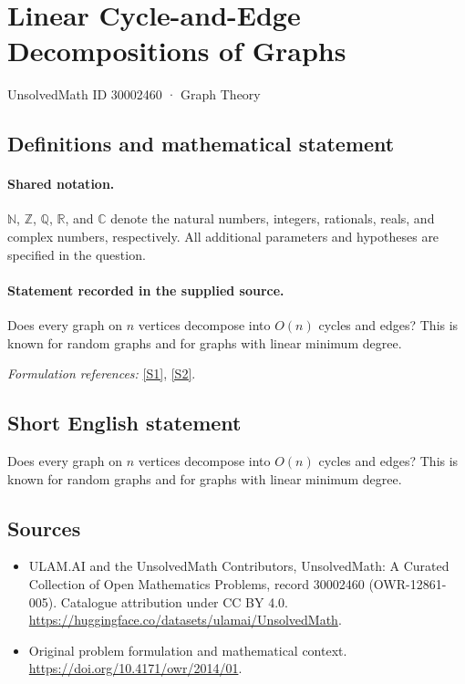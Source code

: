 \documentclass[11pt]{article}
\newcommand{\sref}[2]{\hyperlink{source:#1:#2}{[S#2]}}
\begin{document}
\setcounter{section}{30002459}
\section{Linear Cycle-and-Edge Decompositions of Graphs}\label{30002460}
{\small UnsolvedMath ID 30002460 · Graph Theory}
\subsection{Definitions and mathematical statement}

\paragraph{Shared notation.}$\mathbb N$, $\mathbb Z$, $\mathbb Q$, $\mathbb R$, and $\mathbb C$ denote the natural numbers, integers, rationals, reals, and complex numbers, respectively. All additional parameters and hypotheses are specified in the question.


\paragraph{Statement recorded in the supplied source.}
Does every graph on $n$ vertices decompose into $O(n)$ cycles and edges? This is known for random graphs and for graphs with linear minimum degree.
\par\smallskip\textit{Formulation references:} \sref{30002460}{1}, \sref{30002460}{2}.
\subsection{Short English statement}
Does every graph on $n$ vertices decompose into $O(n)$ cycles and edges? This is known for random graphs and for graphs with linear minimum degree.
\subsection{Sources}
\begin{itemize}
\item[\hypertarget{source:30002460:1}{S1}] ULAM.AI and the UnsolvedMath Contributors, UnsolvedMath: A Curated Collection of Open Mathematics Problems, record 30002460 (OWR-12861-005). Catalogue attribution under CC BY 4.0.
\url{https://huggingface.co/datasets/ulamai/UnsolvedMath}.
\item[\hypertarget{source:30002460:2}{S2}] Original problem formulation and mathematical context.
\url{https://doi.org/10.4171/owr/2014/01}.
\end{itemize}
\label{end:30002460}
\end{document}
